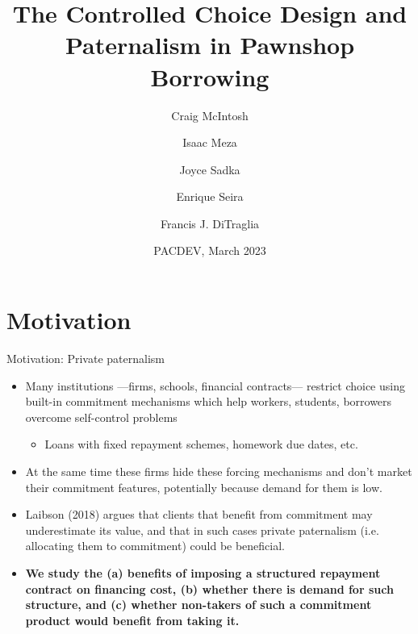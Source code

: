 \documentclass[8pt]{beamer}
\title{The Controlled Choice Design and Paternalism in Pawnshop Borrowing}
\author{Craig McIntosh\inst{1} \and Isaac Meza\inst{2} \and Joyce Sadka\inst{3} \and Enrique Seira\inst{4} \and Francis J. DiTraglia\inst{5} }
\institute[UTran]{\inst{1} UCSD, \inst{2} Harvard , \inst{3} ITAM , \inst{4} MSU , \inst{5} Oxford}
\date{PACDEV, March 2023}
\begin{document}
\begin{frame}[c, noframenumbering]%
\titlepage
\end{frame}


\section{Motivation}



\begin{frame}{Motivation: Private paternalism}
\begin{itemize}
    \item Many institutions —firms, schools, financial contracts— restrict choice using built-in commitment mechanisms which help workers, students, borrowers overcome self-control problems
    \begin{itemize}
        \item Loans with fixed repayment schemes, homework due dates, etc.
    \end{itemize}
    \item At the same time these firms hide these forcing mechanisms and don’t market their commitment features, potentially because demand for them is low.
     \item  Laibson (2018) argues that clients that benefit from commitment may underestimate its value, and that in such cases private paternalism (i.e. allocating them to commitment) could be beneficial.
    \item  \textbf{We study the (a) benefits of imposing a structured repayment contract on financing cost, (b) whether there is demand for such structure, and (c) whether non-takers of such a commitment product would benefit from taking it.}
\end{itemize}

\end{frame}
\end{document}
